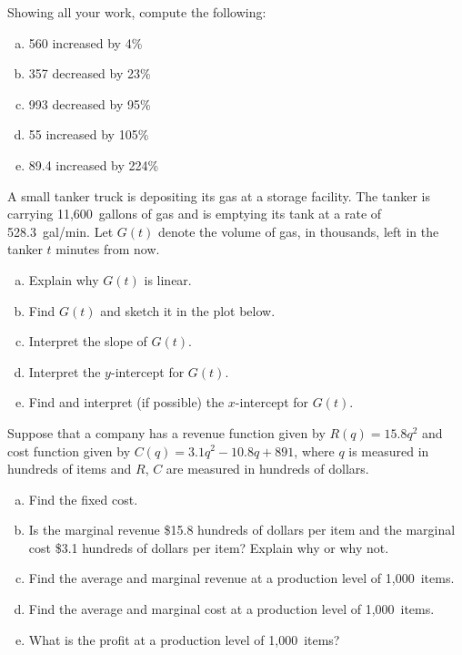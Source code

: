 \documentclass[11pt,letterpaper]{article}
\begin{document}
\prob Showing all your work, compute the following:
	\begin{enumerate}[(a)]
	\item 560 increased by 4\%
	\item 357 decreased by 23\%
	\item 993 decreased by 95\%
	\item 55 increased by 105\%
	\item 89.4 increased by 224\%
	\end{enumerate} \pspace


\prob A small tanker truck is depositing its gas at a storage facility. The tanker is carrying 11,600~gallons of gas and is emptying its tank at a rate of 528.3~gal/min. Let $G(t)$ denote the volume of gas, in thousands, left in the tanker $t$ minutes from now. 
	\begin{enumerate}[(a)]
	\item Explain why $G(t)$ is linear. 
	\item Find $G(t)$ and sketch it in the plot below. 
	\item Interpret the slope of $G(t)$.
	\item Interpret the $y$-intercept for $G(t)$.
	\item Find and interpret (if possible) the $x$-intercept for $G(t)$. 
	\end{enumerate} \pspace





\newpage





\prob Suppose that a company has a revenue function given by $R(q)= 15.8q^2$ and cost function given by $C(q)= 3.1q^2 - 10.8q + 891$, where $q$ is measured in hundreds of items and $R$, $C$ are measured in hundreds of dollars. 
	\begin{enumerate}[(a)]
	\item Find the fixed cost. 
	\item Is the marginal revenue \$15.8 hundreds of dollars per item and the marginal cost \$3.1 hundreds of dollars per item? Explain why or why not. 
	\item Find the average and marginal revenue at a production level of 1,000~items. 
	\item Find the average and marginal cost at a production level of 1,000~items. 
	\item What is the profit at a production level of 1,000~items?
	\end{enumerate} \pspace
\end{document}
